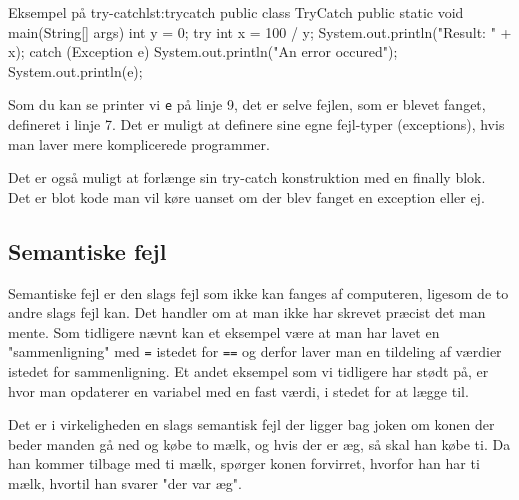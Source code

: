\begin{JavaCode}{Eksempel på try-catch}{lst:trycatch}
public class TryCatch {
	public static void main(String[] args) {
		int y = 0;
		try {
			int x = 100 / y;
			System.out.println("Result: " + x); 
		} catch (Exception e) {
			System.out.println("An error occured");
			System.out.println(e);
		}
	}
}

\end{JavaCode}

\begin{remark}
	Som du kan se printer vi \texttt{e} på linje 9, det er selve fejlen, som er blevet fanget, defineret i linje 7. Det er muligt at definere sine egne fejl-typer (exceptions), hvis man laver mere komplicerede programmer.
	
	Det er også muligt at forlænge sin try-catch konstruktion med en finally blok. Det er blot kode man vil køre uanset om der blev fanget en exception eller ej.
\end{remark}

\subsection{Semantiske fejl}
Semantiske fejl er den slags fejl som ikke kan fanges af computeren, ligesom de to andre slags fejl kan. Det handler om at man ikke har skrevet præcist det man mente. Som tidligere nævnt kan et eksempel være at man har lavet en "sammenligning" med \texttt{=} istedet for \texttt{==} og derfor laver man en tildeling af værdier istedet for sammenligning. Et andet eksempel som vi tidligere har stødt på, er hvor man opdaterer en variabel med en fast værdi, i stedet for at lægge til. 

Det er i virkeligheden en slags semantisk fejl der ligger bag joken om konen der beder manden gå ned og købe to mælk, og hvis der er æg, så skal han købe ti. Da han kommer tilbage med ti mælk, spørger konen forvirret, hvorfor han har ti mælk, hvortil han svarer "der var æg".

